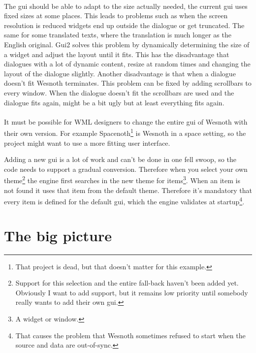 \paragraph{}

The gui should be able to adapt to the size actually needed, the current gui
uses fixed sizes at some places. This leads to problems such as when the screen
resolution is reduced widgets end up outside the dialogue or get truncated. The
same for some translated texts, where the translation is much longer as the
English original. Gui2 solves this problem by dynamically determining the size
of a widget and adjust the layout until it fits. This has the disadvantage that
dialogues with a lot of dynamic content, resize at random times and changing the
layout of the dialogue slightly. Another disadvantage is that when a dialogue
doesn't fit Wesnoth terminates. This problem can be fixed by adding scrollbars
to every window. When the dialogue doesn't fit the scrollbars are used and the
dialogue fits again, might be a bit ugly but at least everything fits again.

\paragraph{}

It must be possible for WML designers to change the entire gui of Wesnoth with
their own version. For example Spacenoth\footnote{That project is dead, but
that doesn't matter for this example.} is Wesnoth in a space setting, so the
project might want to use a more fitting user interface.

Adding a new gui is a lot of work and can't be done in one fell swoop, so the
code needs to support a gradual conversion. Therefore when you select your own
theme\footnote{Support for this selection and the entire fall-back haven't been
added yet. Obviously I want to add support, but it remains low priority until
somebody really wants to add their own gui.} the engine first searches in the
new theme for items\footnote{A widget or window.}. When an item is not found it
uses that item from the default theme. Therefore it's mandatory that every item
is defined for the default gui, which the engine validates at
startup\footnote{That causes the problem that Wesnoth sometimes refused to start
when the source and data are out-of-sync.}.

\section{The big picture}

